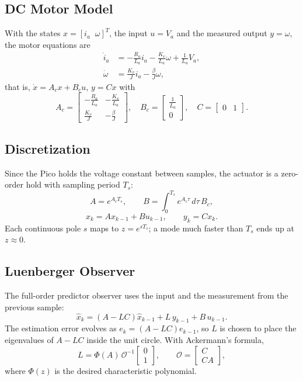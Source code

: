 \documentclass[conference,a4paper]{IEEEtran}
\begin{document}
\subsection{DC Motor Model}
With the states $x=[i_a\;\;\omega]^T$, the input $u=V_a$ and the measured output $y=\omega$, the motor equations are
\begin{align}
\dot{i}_a &= -\frac{R_a}{L_a} i_a - \frac{K_v}{L_a}\omega + \frac{1}{L_a}V_a,\\
\dot{\omega} &= \frac{K_v}{J} i_a - \frac{\beta}{J}\omega,
\end{align}
that is, $\dot{x}=A_c x + B_c u$, $y = Cx$ with
\begin{equation}
A_c=\begin{bmatrix}-\frac{R_a}{L_a} & -\frac{K_v}{L_a}\\[2pt] \frac{K_v}{J} & -\frac{\beta}{J}\end{bmatrix},\quad
B_c=\begin{bmatrix}\frac{1}{L_a}\\[2pt] 0\end{bmatrix},\quad
C=\begin{bmatrix}0 & 1\end{bmatrix}.
\end{equation}

\subsection{Discretization}
Since the Pico holds the voltage constant between samples, the actuator is a zero-order hold with sampling period $T_s$:
\begin{equation}
A = e^{A_c T_s},\qquad B=\int_0^{T_s} e^{A_c\tau}\,d\tau\, B_c,
\end{equation}
\begin{equation}
x_k = A x_{k-1} + B u_{k-1},\qquad y_k = C x_k .
\end{equation}
Each continuous pole $s$ maps to $z=e^{sT_s}$; a mode much faster than $T_s$ ends up at $z\approx0$.

\subsection{Luenberger Observer}
The full-order predictor observer uses the input and the measurement from the previous sample:
\begin{equation}
\hat{x}_k = (A-LC)\hat{x}_{k-1} + L\,y_{k-1} + B\,u_{k-1}.
\label{eq:luen}
\end{equation}
The estimation error evolves as $e_k=(A-LC)e_{k-1}$, so $L$ is chosen to place the eigenvalues of $A-LC$ inside the unit circle. With Ackermann's formula,
\begin{equation}
L = \Phi(A)\,\mathcal{O}^{-1}\begin{bmatrix}0\\1\end{bmatrix},\qquad \mathcal{O}=\begin{bmatrix}C\\CA\end{bmatrix},
\end{equation}
where $\Phi(z)$ is the desired characteristic polynomial.
\end{document}
